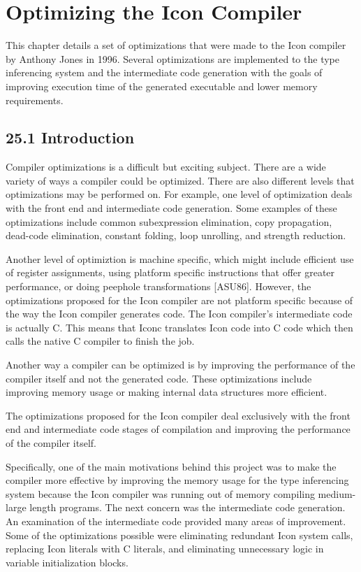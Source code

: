 \clearpage\chapter{Optimizing the Icon Compiler}

This chapter details a set of optimizations that were made to the Icon
compiler by Anthony Jones in 1996. Several optimizations are
implemented to the type inferencing system and the intermediate code
generation with the goals of improving execution time of the generated
executable and lower memory requirements.

\section[25.1 Introduction]{25.1 Introduction}

Compiler optimizations is a difficult but exciting subject. There are
a wide variety of ways a compiler could be optimized. There are also
different levels that optimizations may be performed on. For example,
one level of optimization deals with the front end and intermediate
code generation. Some examples of these optimizations include common
subexpression elimination, copy propagation, dead-code elimination,
constant folding, loop unrolling, and strength reduction.

Another level of optimiztion is machine specific, which might include
efficient use of register assignments, using platform specific
instructions that offer greater performance, or doing peephole
transformations [ASU86]. However, the optimizations proposed for the
Icon compiler are not platform specific because of the way the Icon
compiler generates code. The Icon compiler's intermediate code is
actually C. This means that Iconc translates Icon code into C code
which then calls the native C compiler to finish the job.

Another way a compiler can be optimized is by improving the
performance of the compiler itself and not the generated code. These
optimizations include improving memory usage or making internal data
structures more efficient.

The optimizations proposed for the Icon compiler deal exclusively with
the front end and intermediate code stages of compilation and
improving the performance of the compiler itself.

Specifically, one of the main motivations behind this project was to
make the compiler more effective by improving the memory usage for the
type inferencing system because the Icon compiler was running out of
memory compiling medium-large length programs. The next concern was
the intermediate code generation. An examination of the intermediate
code provided many areas of improvement. Some of the optimizations
possible were eliminating redundant Icon system calls, replacing Icon
literals with C literals, and eliminating unnecessary logic in
variable initialization blocks.


